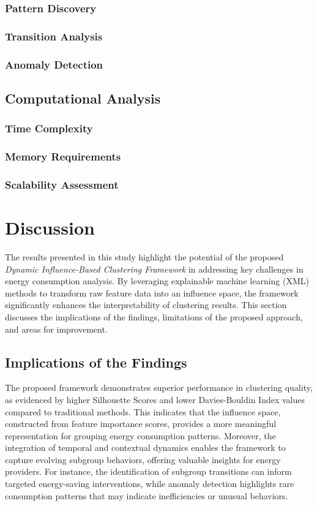 \documentclass[final,5p,times,twocolumn,numbers]{elsarticle}
\begin{document}
\subsubsection{Pattern Discovery}
\subsubsection{Transition Analysis}
\subsubsection{Anomaly Detection}

\subsection{Computational Analysis}
\subsubsection{Time Complexity}
\subsubsection{Memory Requirements}
\subsubsection{Scalability Assessment}

\section{Discussion}
\label{sec:diss}
The results presented in this study highlight the potential of the proposed \textit{Dynamic Influence-Based Clustering Framework} in addressing key challenges in energy consumption analysis. By leveraging explainable machine learning (XML) methods to transform raw feature data into an influence space, the framework significantly enhances the interpretability of clustering results. This section discusses the implications of the findings, limitations of the proposed approach, and areas for improvement.

\subsection{Implications of the Findings}
The proposed framework demonstrates superior performance in clustering quality, as evidenced by higher Silhouette Scores and lower Davies-Bouldin Index values compared to traditional methods. This indicates that the influence space, constructed from feature importance scores, provides a more meaningful representation for grouping energy consumption patterns. Moreover, the integration of temporal and contextual dynamics enables the framework to capture evolving subgroup behaviors, offering valuable insights for energy providers. For instance, the identification of subgroup transitions can inform targeted energy-saving interventions, while anomaly detection highlights rare consumption patterns that may indicate inefficiencies or unusual behaviors.
\end{document}
